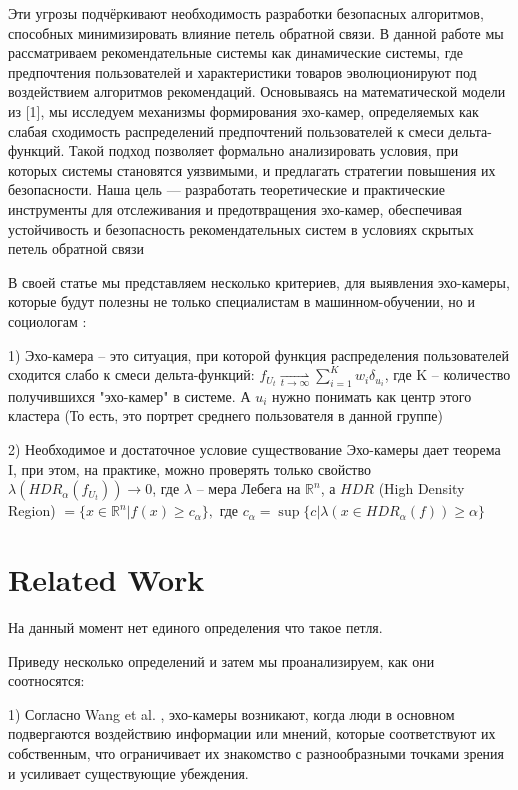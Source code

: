 \documentclass{article}
\begin{document}
Эти угрозы подчёркивают необходимость разработки безопасных алгоритмов, способных минимизировать влияние петель обратной связи.
В данной работе мы рассматриваем рекомендательные системы как динамические
системы, где предпочтения пользователей и характеристики товаров эволюционируют
под воздействием алгоритмов рекомендаций. Основываясь на математической модели
из [1], мы исследуем механизмы формирования эхо-камер, определяемых как слабая сходимость распределений предпочтений пользователей к смеси дельта-функций. Такой
подход позволяет формально анализировать условия, при которых системы становятся
уязвимыми, и предлагать стратегии повышения их безопасности. Наша цель — разработать теоретические и практические инструменты для отслеживания и предотвращения
эхо-камер, обеспечивая устойчивость и безопасность рекомендательных систем в условиях скрытых петель обратной связи


В своей статье мы представляем несколько критериев, для выявления эхо-камеры, которые будут полезны не только специалистам в машинном-обучении, но и социологам : 

1) Эхо-камера – это ситуация, при которой функция распределения пользователей сходится слабо к смеси дельта-функций: $f_{U_t} \underset{t\rightarrow \infty}{\rightharpoonup} \sum_{i=1}^K w_i \delta_{u_i}$, где K – количество получившихся "эхо-камер" в системе. А $u_i$ нужно понимать как центр этого кластера (То есть, это портрет среднего пользователя в данной группе)

2) Необходимое и достаточное условие существование Эхо-камеры дает теорема I, при этом, на практике, можно проверять только свойство $\lambda (HDR_{\alpha} (f_{U_t}) ) \rightarrow 0$, где $\lambda$ – мера Лебега на $\mathbb{R}^n$, а $HDR$ (High Density Region) $= \{x\in \mathbb{R}^n | f(x) \geq c_\alpha \}, $ где $c_{\alpha} = \sup \{ c |  \lambda (x \in HDR_{\alpha}(f) ) \geq \alpha  \}$ 



\section{Related Work}
На данный момент нет единого определения что такое петля. 

Приведу несколько определений и затем мы проанализируем, как они соотносятся: 

1) Согласно Wang et al. \cite{wang2025decoding}, эхо-камеры возникают, когда люди в основном подвергаются воздействию информации или мнений, которые соответствуют их собственным, что ограничивает их знакомство с разнообразными точками зрения и усиливает существующие убеждения.
\end{document}
